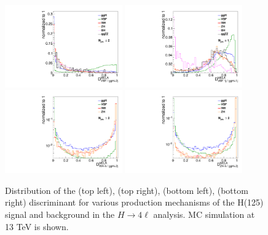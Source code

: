 \begin{figure}[!htb]
\vspace*{0.3cm}
\begin{center}
\includegraphics[width=0.45\textwidth]{Figures/Observables/cBCInSR_D2jVbfHjj_m4l118to130_bList10_.pdf}
\includegraphics[width=0.45\textwidth]{Figures/Observables/cBCInSR_D1jVbfHj_m4l118to130_bList10_.pdf}
\includegraphics[width=0.45\textwidth]{Figures/Observables/cBCInSR_D2jWHHadrHjj_m4l118to130_bList10_.pdf}
\includegraphics[width=0.45\textwidth]{Figures/Observables/cBCInSR_D2jZHHadrHjj_m4l118to130_bList10_.pdf}
\caption
{
Distribution of the 
\DMeVbfjj (top left),
\DMeVbfj (top right),
\DMeWh (bottom left),
\DMeZh (bottom right) 
discriminant for various production mechanisms of the H(125) signal and background
in the $H\to 4\ell$ analysis. MC simulation at 13 TeV is shown.
\label{fig:melaVBFVH}
}
\end{center}
\end{figure}

